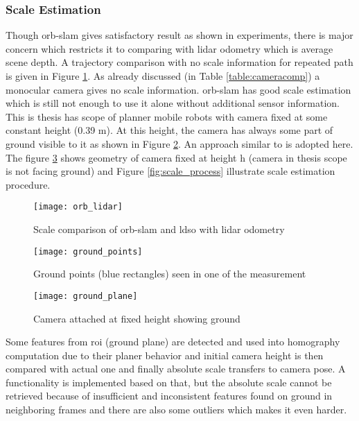 \subsubsection{Scale Estimation}
Though \acrshort{orb}-\acrshort{slam} gives satisfactory result as shown in experiments, there is major concern which restricts it to comparing with \acrshort{lidar} odometry which is average scene depth. A trajectory comparison with no scale information for repeated path is given in Figure \ref{fig:orb_lidar}. As already discussed (in Table \ref{table:cameracomp}) a monocular camera gives no scale information. \acrshort{orb}-\acrshort{slam} has good scale estimation which is still not enough to use it alone without additional sensor information.\\
\newline This is thesis has scope of planner mobile robots with camera fixed at some constant height (0.39 m). At this height, the camera has always some part of ground visible to it as shown in Figure \ref{fig:ground_points}. An approach similar to \cite{ground} is adopted here. The figure \ref{fig:ground_plane} shows geometry of camera fixed at height h (camera in thesis scope is not facing ground) and Figure \ref{fig:scale_process} illustrate scale estimation procedure.
\begin{figure}[H]
	\centering
	\texttt{[image: orb\_lidar]}
	\caption{Scale comparison of \acrshort{orb}-\acrshort{slam} and \acrshort{ldso} with \acrshort{lidar} odometry}
	\label{fig:orb_lidar}
\end{figure}
\begin{figure}[H]
	\centering
	\texttt{[image: ground\_points]}
	\caption{Ground points (blue rectangles) seen in one of the measurement}
	\label{fig:ground_points}
\end{figure}
\begin{figure}[H]
	\centering
	\texttt{[image: ground\_plane]}
	\caption{Camera attached at fixed height showing ground \cite{ground}}
	\label{fig:ground_plane}
\end{figure}
\noindent Some features from \acrshort{roi} (ground plane) are detected and used into homography computation due to their planer behavior and initial camera height is then compared with actual one and finally absolute scale transfers to camera pose. A functionality is implemented based on that, but the absolute scale cannot be retrieved because of insufficient and inconsistent features found on ground in neighboring frames and there are also some outliers which makes it even harder.\\

